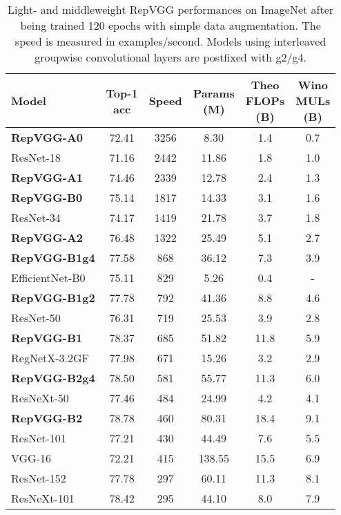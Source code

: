 \setlength{\tabcolsep}{5pt}
\begin{table}
	\begin{center}
		\begin{tabular}{lccccc} 
			\hline
			\parbox[c][1.5cm]{0.7cm}{\centering Model} & \parbox[c][1.5cm]{0.9cm}{\centering Top-1\\acc} & \parbox[c][1.5cm]{0.75cm}{\centering Speed} & \parbox[c][1.5cm]{0.75cm}{\centering Params\\(M)} & \parbox[c][1.5cm]{0.75cm}{\centering Theo\\FLOPs\\(B)} & \parbox[c][1.5cm]{0.75cm}{\centering Wino\\MULs\\(B)}\\
			\hline
			\textbf{RepVGG-A0} & 72.41 & 3256 & 8.30 & 1.4 & 0.7 \\
			ResNet-18 & 71.16 & 2442 & 11.86 & 1.8 & 1.0 \\
			\hline
			\textbf{RepVGG-A1} & 74.46 & 2339 & 12.78 & 2.4 & 1.3 \\
			\textbf{RepVGG-B0} & 75.14 & 1817 & 14.33 & 3.1 & 1.6 \\
			ResNet-34 & 74.17 & 1419 & 21.78 & 3.7 & 1.8 \\
			\hline
			\textbf{RepVGG-A2} & 76.48 & 1322 & 25.49 & 5.1 & 2.7 \\
			\textbf{RepVGG-B1g4} & 77.58 & 868 & 36.12 & 7.3 & 3.9 \\
			EfficientNet-B0 & 75.11 & 829 & 5.26 & 0.4 & - \\
			\hline
			\textbf{RepVGG-B1g2} & 77.78 & 792 & 41.36 & 8.8 & 4.6 \\
			ResNet-50 & 76.31 & 719 & 25.53 & 3.9 & 2.8 \\
			\hline
			\textbf{RepVGG-B1} & 78.37 & 685 & 51.82 & 11.8 & 5.9 \\
			RegNetX-3.2GF & 77.98 & 671 & 15.26 & 3.2 & 2.9 \\
			\hline
			\textbf{RepVGG-B2g4} & 78.50 & 581 & 55.77 & 11.3 & 6.0 \\
			ResNeXt-50 & 77.46 & 484 & 24.99 & 4.2 & 4.1 \\
			\hline
			\textbf{RepVGG-B2} & 78.78 & 460 & 80.31 & 18.4 & 9.1 \\
			ResNet-101 & 77.21 & 430 & 44.49 & 7.6 & 5.5 \\
			VGG-16 & 72.21 & 415 & 138.55 & 15.5 & 6.9 \\
			ResNet-152 & 77.78 & 297 & 60.11 & 11.3 & 8.1 \\
			ResNeXt-101 & 78.42 & 295 & 44.10 & 8.0 & 7.9 \\
			\hline
		\end{tabular}
	\end{center}
	\caption{Light- and middleweight RepVGG performances on ImageNet \cite{JiaDeng.2009} after being trained 120 epochs with simple data augmentation. The speed is measured in examples/second. Models using interleaved groupwise convolutional layers are postfixed with g2/g4. \cite{XiaohanDing.2021}}
	\label{tab:results1}
\end{table}
\setlength{\tabcolsep}{6pt}

